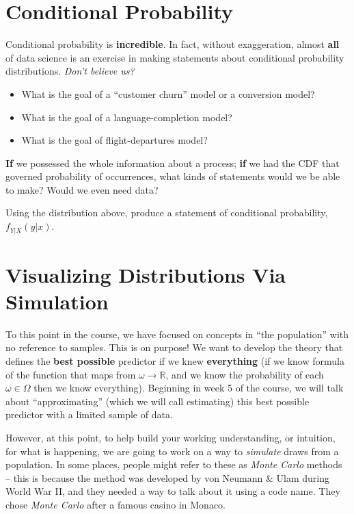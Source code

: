 \documentclass[
]{book}
\providecommand{\tightlist}{%
  \setlength{\itemsep}{0pt}\setlength{\parskip}{0pt}}
\theoremstyle{definition}
\theoremstyle{definition}
\theoremstyle{definition}
\theoremstyle{definition}
\theoremstyle{remark}
\begin{document}
\hypertarget{conditional-probability}{%
\section{Conditional Probability}\label{conditional-probability}}

Conditional probability is \textbf{incredible}. In fact, without exaggeration, almost \textbf{all} of data science is an exercise in making statements about conditional probability distributions. \emph{Don't believe us?}

\begin{itemize}
\tightlist
\item
  What is the goal of a ``customer churn'' model or a conversion model?
\item
  What is the goal of a language-completion model?
\item
  What is the goal of flight-departures model?
\end{itemize}

\textbf{If} we possessed the whole information about a process; \textbf{if} we had the CDF that governed probability of occurrences, what kinds of statements would we be able to make? Would we even need data?

Using the distribution above, produce a statement of conditional probability, \(f_{Y|X}(y|x)\).

\hypertarget{visualizing-distributions-via-simulation}{%
\section{Visualizing Distributions Via Simulation}\label{visualizing-distributions-via-simulation}}

To this point in the course, we have focused on concepts in ``the population'' with no reference to samples. This is on purpose! We want to develop the theory that defines the \textbf{best possible} predictor if we knew \textbf{everything} (if we know formula of the function that maps from \(\omega \rightarrow \mathbb{R}\), and we know the probability of each \(\omega \in \Omega\) then we know everything). Beginning in week 5 of the course, we will talk about ``approximating'' (which we will call estimating) this best possible predictor with a limited sample of data.

However, at this point, to help build your working understanding, or intuition, for what is happening, we are going to work on a way to \emph{simulate} draws from a population. In some places, people might refer to these as \emph{Monte Carlo} methods -- this is because the method was developed by von Neumann \& Ulam during World War II, and they needed a way to talk about it using a code name. They chose \emph{Monte Carlo} after a famous casino in Monaco.
\end{document}
